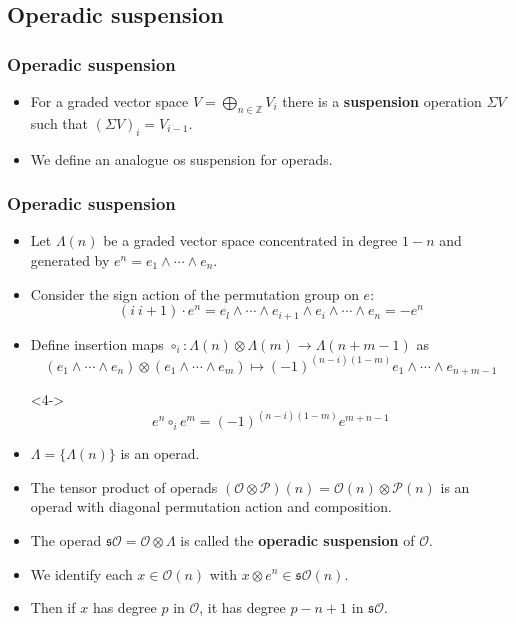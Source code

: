 \documentclass{beamer}
\theoremstyle{definition}
\newcommand{\Z}{\mathbb{Z}}
\begin{document}
\subsection{Operadic suspension}
\begin{frame}
\frametitle{Operadic suspension}
\begin{itemize}
\item<1-> For a graded vector space $V=\bigoplus_{n\in\Z} V_i$ there is a \textbf{suspension} operation $\Sigma V$ such that $(\Sigma V)_i=V_{i-1}$. %
\item<2-> We define an analogue os suspension for operads.
\end{itemize}
\end{frame}
\begin{frame}
\frametitle{Operadic suspension}
\begin{itemize}
\item<1-> Let $\Lambda(n)$ be a graded vector space concentrated in degree $1-n$ and generated by $e^n=e_1\land\cdots\land e_n$.
\item<2-> Consider the sign action of the permutation group on $e$:
\[(i\ i+1)\cdot e^n=e_l\land\cdots\land e_{i+1}\land e_i\land\cdots\land e_n=-e^n\]
\item<3-> Define insertion maps $\circ_i:\Lambda(n)\otimes\Lambda(m)\to\Lambda(n+m-1)$ as
\[(e_1\land\cdots\land e_n)\otimes(e_1\land\cdots\land e_m)\mapsto  (-1)^{(n-i)(1-m)}e_1\land\cdots\land e_{n+m-1}\]
\item[]<4-> \[e^n\circ_i e^m= (-1)^{(n-i)(1-m)}e^{m+n-1}\]
\end{itemize}
\end{frame}

\begin{frame}
\begin{itemize}
\item<1-> $\Lambda=\{\Lambda(n)\}$ is an operad.
\item<2-> The tensor product of operads $(\mathcal{O}\otimes \mathcal{P})(n)=\mathcal{O}(n)\otimes \mathcal{P}(n)$ is an operad with diagonal permutation action and composition. %
\item<3-> The operad $\mathfrak{s}\mathcal{O}=\mathcal{O}\otimes\Lambda$ is called the \textbf{operadic suspension} of $\mathcal{O}$.
\item<4-> We identify each $x\in\mathcal{O}(n)$ with $x\otimes e^n\in \mathfrak{s}\mathcal{O}(n)$.
\item<5-> Then if $x$ has degree $p$ in $\mathcal{O}$, it has degree $p-n+1$ in $\mathfrak{s}\mathcal{O}$.
\end{itemize}
\end{frame}
\end{document}
